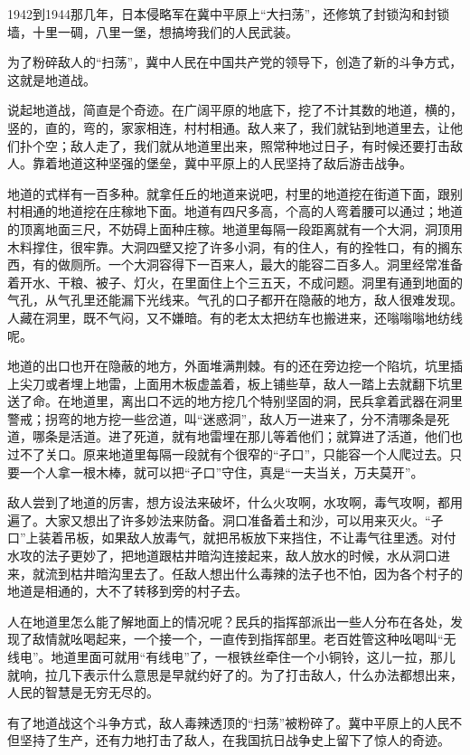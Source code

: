 \documentclass[12pt,UTF-8,openany]{ctexbook}
\begin{document}
\begin{large}
    
    1942到1944那几年，日本侵略军在冀中平原上“大扫荡”，还修筑了封锁沟和封锁墙，十里一碉，八里一堡，想搞垮我们的人民武装。
    
    为了粉碎敌人的“扫荡”，冀中人民在中国共产党的领导下，创造了新的斗争方式，这就是地道战。
    
    说起地道战，简直是个奇迹。在广阔平原的地底下，挖了不计其数的地道，横的，竖的，直的，弯的，家家相连，村村相通。敌人来了，我们就钻到地道里去，让他们扑个空；敌人走了，我们就从地道里出来，照常种地过日子，有时候还要打击敌人。靠着地道这种坚强的堡垒，冀中平原上的人民坚持了敌后游击战争。
    
    地道的式样有一百多种。就拿任丘的地道来说吧，村里的地道挖在街道下面，跟别村相通的地道挖在庄稼地下面。地道有四尺多高，个高的人弯着腰可以通过；地道的顶离地面三尺，不妨碍上面种庄稼。地道里每隔一段距离就有一个大洞，洞顶用木料撑住，很牢靠。大洞四壁又挖了许多小洞，有的住人，有的拴牲口，有的搁东西，有的做厕所。一个大洞容得下一百来人，最大的能容二百多人。洞里经常准备着开水、干粮、被子、灯火，在里面住上个三五天，不成问题。洞里有通到地面的气孔，从气孔里还能漏下光线来。气孔的口子都开在隐蔽的地方，敌人很难发现。人藏在洞里，既不气闷，又不嫌暗。有的老太太把纺车也搬进来，还嗡嗡嗡地纺线呢。
    
    地道的出口也开在隐蔽的地方，外面堆满荆棘。有的还在旁边挖一个陷坑，坑里插上尖刀或者埋上地雷，上面用木板虚盖着，板上铺些草，敌人一踏上去就翻下坑里送了命。在地道里，离出口不远的地方挖几个特别坚固的洞，民兵拿着武器在洞里警戒；拐弯的地方挖一些岔道，叫“迷惑洞”，敌人万一进来了，分不清哪条是死道，哪条是活道。进了死道，就有地雷埋在那儿等着他们；就算进了活道，他们也过不了关口。原来地道里每隔一段就有个很窄的“孑口”，只能容一个人爬过去。只要一个人拿一根木棒，就可以把“孑口”守住，真是“一夫当关，万夫莫开”。
    
    敌人尝到了地道的厉害，想方设法来破坏，什么火攻啊，水攻啊，毒气攻啊，都用遍了。大家又想出了许多妙法来防备。洞口准备着土和沙，可以用来灭火。“孑口”上装着吊板，如果敌人放毒气，就把吊板放下来挡住，不让毒气往里透。对付水攻的法子更妙了，把地道跟枯井暗沟连接起来，敌人放水的时候，水从洞口进来，就流到枯井暗沟里去了。任敌人想出什么毒辣的法子也不怕，因为各个村子的地道是相通的，大不了转移到旁的村子去。
    
    人在地道里怎么能了解地面上的情况呢？民兵的指挥部派出一些人分布在各处，发现了敌情就吆喝起来，一个接一个，一直传到指挥部里。老百姓管这种吆喝叫“无线电”。地道里面可就用“有线电”了，一根铁丝牵住一个小铜铃，这儿一拉，那儿就响，拉几下表示什么意思是早就约好了的。为了打击敌人，什么办法都想出来，人民的智慧是无穷无尽的。
    
    有了地道战这个斗争方式，敌人毒辣透顶的“扫荡”被粉碎了。冀中平原上的人民不但坚持了生产，还有力地打击了敌人，在我国抗日战争史上留下了惊人的奇迹。
    
\end{large}
\end{document}
